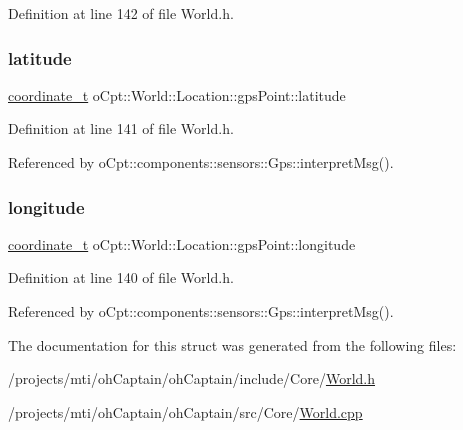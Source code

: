 Definition at line 142 of file World.\+h.

\hypertarget{structo_cpt_1_1_world_1_1_location_1_1gps_point_a28047329a2c8750f2d6c54dfa3ce8bb4}{}\label{structo_cpt_1_1_world_1_1_location_1_1gps_point_a28047329a2c8750f2d6c54dfa3ce8bb4} 
\subsubsection{\texorpdfstring{latitude}{latitude}}
{\footnotesize\ttfamily \hyperlink{classo_cpt_1_1_world_1_1_location_ade9263a17c41b7af085dfcb9055b18f3}{coordinate\+\_\+t} o\+Cpt\+::\+World\+::\+Location\+::gps\+Point\+::latitude}



Definition at line 141 of file World.\+h.



Referenced by o\+Cpt\+::components\+::sensors\+::\+Gps\+::interpret\+Msg().

\hypertarget{structo_cpt_1_1_world_1_1_location_1_1gps_point_a043e3f4795590cee2c41df63769c3b17}{}\label{structo_cpt_1_1_world_1_1_location_1_1gps_point_a043e3f4795590cee2c41df63769c3b17} 
\subsubsection{\texorpdfstring{longitude}{longitude}}
{\footnotesize\ttfamily \hyperlink{classo_cpt_1_1_world_1_1_location_ade9263a17c41b7af085dfcb9055b18f3}{coordinate\+\_\+t} o\+Cpt\+::\+World\+::\+Location\+::gps\+Point\+::longitude}



Definition at line 140 of file World.\+h.



Referenced by o\+Cpt\+::components\+::sensors\+::\+Gps\+::interpret\+Msg().



The documentation for this struct was generated from the following files\+:\begin{DoxyCompactItemize}
\item 
/projects/mti/oh\+Captain/oh\+Captain/include/\+Core/\hyperlink{_world_8h}{World.\+h}\item 
/projects/mti/oh\+Captain/oh\+Captain/src/\+Core/\hyperlink{_world_8cpp}{World.\+cpp}\end{DoxyCompactItemize}
